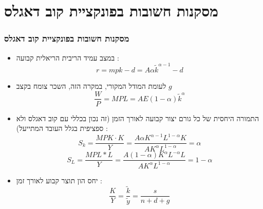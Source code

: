 \documentclass[usenames,dvipsnames]{beamer}
\begin{document}
\begin{RTL}
\begin{frame}[allowframebreaks]
\end{frame}

\section{מסקנות חשובות בפונקציית קוב דאגלס}

\begin{frame}[allowframebreaks]
    \frametitle{מסקנות חשובות בפונקציית קוב דאגלס}
    \begin{itemize}
        \item במצב עמיד הריבית הריאלית קבועה : 
        $$r = mpk - d = A\alpha \tilde{k} ^ {\alpha - 1 } - d $$
        \item לעומת המודל המקורי, במקרה הזה, השכר צומח בקצב $g$ $$\frac{W}{P} = MPL = A E \left(1 - \alpha \right) \tilde{k} ^ \alpha$$
        \item התמורה היחסית של כל גורם יצור קבועה לאורך הזמן (זה נכון בכללי עם קוב דאגלס ולא ספציפית בגלל העובד המתייעל) : $$S_k = \frac{MPK \cdot K}{Y } = \frac{A \alpha K^{\alpha - 1 } L ^{1 - \alpha} K }{A K^\alpha L^{1-\alpha}} = \alpha$$ $$
        {S}_L=\frac{M P L * L}{Y}=\frac{A(1-\alpha) K^\alpha L^{-\alpha} L}{A K^\alpha L^{1-\alpha}}=1-\alpha
        $$
        \item יחס הון תוצר קבוע לאורך זמן : $$\frac{K}{Y} = \frac{\tilde{k}}{\tilde{y}} = \frac{s}{n+d+g}$$
    \end{itemize}
    

\end{frame}

\end{RTL}
\end{document}

